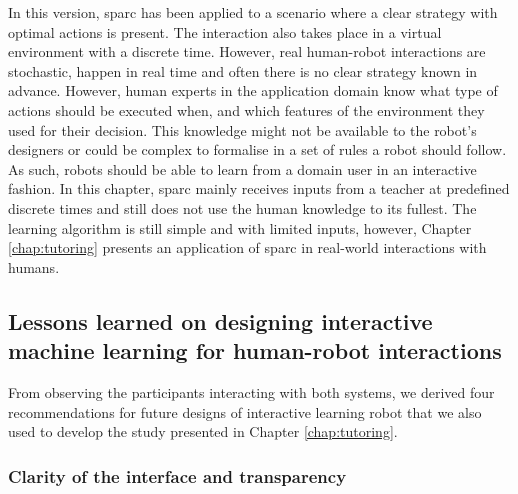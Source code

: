 In this version, \gls{sparc} has been applied to a scenario where a clear strategy with optimal actions is present. The interaction also takes place in a virtual environment with a discrete time. However, real human-robot interactions are stochastic, happen in real time and often there is no clear strategy known in advance. However, human experts in the application domain know what type of actions should be executed when, and which features of the environment they used for their decision. This knowledge might not be available to the robot's designers or could be complex to formalise in a set of rules a robot should follow. As such, robots should be able to learn from a domain user in an interactive fashion. In this chapter, \gls{sparc} mainly receives inputs from a teacher at predefined discrete times and still does not use the human knowledge to its fullest. The learning algorithm is still simple and with limited inputs, however, Chapter \ref{chap:tutoring} presents an application of \gls{sparc} in real-world interactions with humans.


\subsection{Lessons learned on designing interactive machine learning for human-robot interactions}

From observing the participants interacting with both systems, we derived four recommendations for future designs of interactive learning robot that we also used to develop the study presented in Chapter \ref{chap:tutoring}. 

\subsubsection{Clarity of the interface and transparency}

